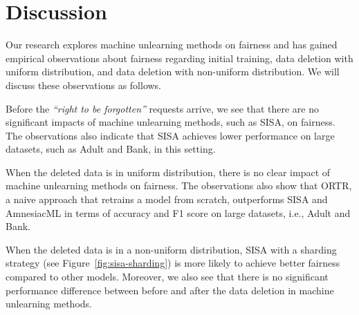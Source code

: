 

\section{Discussion}
\label{sec:discussion}

Our research explores machine unlearning methods on fairness and has gained empirical observations about fairness regarding initial training, data deletion with uniform distribution, and data deletion with non-uniform distribution. We will discuss these observations as follows. 

Before the \textit{``right to be forgotten''} requests arrive, we see that there are no significant impacts of machine unlearning methods, such as SISA, on fairness. The observations also indicate that SISA achieves lower performance on large datasets, such as Adult and Bank, in this setting.

When the deleted data is in uniform distribution, there is no clear impact of machine unlearning methods on fairness. The observations also show that ORTR, a naive approach that retrains a model from scratch, outperforms SISA and AmnesiacML in terms of accuracy and F1 score on large datasets, i.e., Adult and Bank.


When the deleted data is in a non-uniform distribution, SISA with a sharding strategy (see Figure~\ref{fig:sisa-sharding}) is more likely to achieve better fairness compared to other models. Moreover, we also see that there is no significant performance difference between before and after the data deletion in machine unlearning methods.